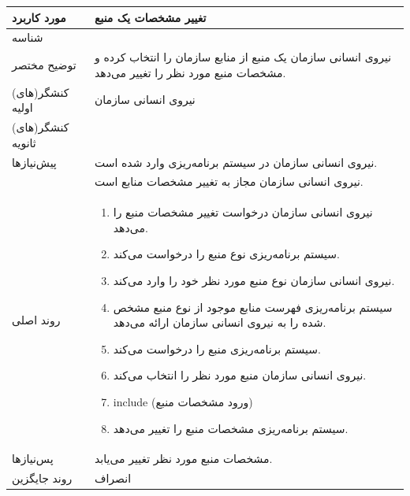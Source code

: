 \begin{table}[H]
	\centering
	\begin{tabular}{|p{3cm}|p{10cm}|}
		\hline
		
		مورد کاربرد	& تغییر مشخصات یک منبع  \\
		\hline
		
		شناسه & 
		\stepcounter{usecase_ID}
		
		\arabic{usecase_ID} \\
		
		\hline
		
		توضیح مختصر & نیروی انسانی سازمان یک منبع از منابع سازمان را انتخاب کرده و مشخصات منبع مورد نظر را تغییر می‌دهد. \\
		\hline
		
		کنشگر(های) اولیه& نیروی انسانی سازمان  \\
		\hline
		
		کنشگر(های) ثانویه&  \\
		\hline
		
		پیش‌نیازها &
		نیروی انسانی سازمان در سیستم برنامه‌ریزی وارد شده است.\\
		& نیروی انسانی سازمان مجاز به تغییر مشخصات منابع است. \\
		\hline
		
		
		روند اصلی &
		\begin{enumerate}[topsep=0cm,leftmargin=0.5cm]
			\item نیروی انسانی سازمان  درخواست تغییر مشخصات منبع را می‌دهد.
			\item سیستم برنامه‌ریزی نوع منبع را درخواست می‌کند.
			\item نیروی انسانی سازمان  نوع منبع مورد نظر خود را وارد می‌کند.
			\item سیستم برنامه‌ریزی فهرست منابع موجود از نوع منبع مشخص شده را به نیروی انسانی سازمان ارائه می‌دهد.
			\item سیستم برنامه‌ریزی منبع را درخواست می‌کند.
			\item نیروی انسانی سازمان منبع مورد نظر را انتخاب می‌کند.
			\item include (ورود مشخصات منبع)
			\item سیستم برنامه‌ریزی مشخصات منبع را تغییر می‌دهد.
		\end{enumerate} \\
		\hline
		
		پس‌نیازها &
		مشخصات منبع مورد نظر تغییر می‌یابد. \\
		
		\hline
		روند جایگزین
		& انصراف \\
		\hline
		
	\end{tabular}
\end{table}


